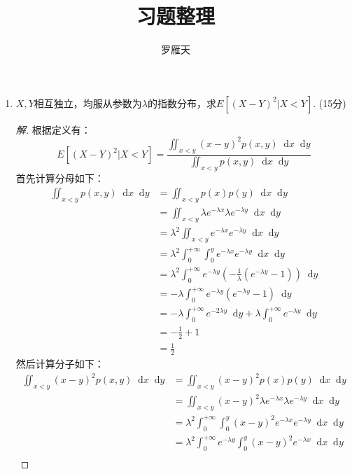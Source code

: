 \documentclass[12pt]{article}
\newcommand{\hei}{\CJKfamily{hei}}                          %
\newcommand*{\dif}{\mathop{}\!\mathrm{d}}
\begin{document}
\author{罗雁天}
\title{习题整理}
\maketitle

\medskip

\begin{enumerate}
\item {\hei $X,Y$相互独立，均服从参数为$\lambda$的指数分布，求$E[(X-Y)^2|X<Y]$. (15分)}
\begin{proof}[解]
	根据定义有：
	\begin{equation}
	E[(X-Y)^2|X<Y]=\frac{\iint_{x<y}(x-y)^2p(x,y)\dif x\dif y}{\iint_{x<y}p(x,y)\dif x\dif y}
	\end{equation}
	首先计算分母如下：
	\begin{equation}
	\begin{aligned}
	\iint_{x<y}p(x,y)\dif x\dif y&=\iint_{x<y}p(x)p(y)\dif x\dif y \\
	&=\iint_{x<y}\lambda e^{-\lambda x} \lambda e^{-\lambda y}\dif x\dif y \\
	&=\lambda^2 \iint_{x<y}e^{-\lambda x}e^{-\lambda y}\dif x\dif y \\
	&=\lambda^2 \int_{0}^{+\infty}\int_{0}^{y}e^{-\lambda x}e^{-\lambda y}\dif x\dif y \\
	&=\lambda^2 \int_{0}^{+\infty}e^{-\lambda y} \left(-\frac{1}{\lambda}\left(e^{-\lambda y}-1\right)\right)\dif y \\
	&=-\lambda\int_{0}^{+\infty}e^{-\lambda y}\left(e^{-\lambda y}-1\right)\dif y\\
	&=-\lambda\int_{0}^{+\infty}e^{-2\lambda y}\dif y+\lambda \int_{0}^{+\infty}e^{-\lambda y}\dif y \\
	&=-\frac{1}{2}+1 \\
	&=\frac{1}{2}
	\end{aligned}
	\end{equation}
	然后计算分子如下：
	\begin{equation}
	\begin{aligned}
	\iint_{x<y}(x-y)^2p(x,y)\dif x\dif y&=\iint_{x<y}(x-y)^2p(x)p(y)\dif x\dif y \\
	&=\iint_{x<y}(x-y)^2\lambda e^{-\lambda x} \lambda e^{-\lambda y}\dif x\dif y \\
	&=\lambda^2 \int_{0}^{+\infty}\int_{0}^{y}(x-y)^2e^{-\lambda x}e^{-\lambda y}\dif x\dif y \\
	&=\lambda^2 \int_{0}^{+\infty}e^{-\lambda y}\int_{0}^{y}(x-y)^2e^{-\lambda x}\dif x\dif y \\

\end{aligned}
\end{equation}
\end{proof}
\end{enumerate}
\end{document}
